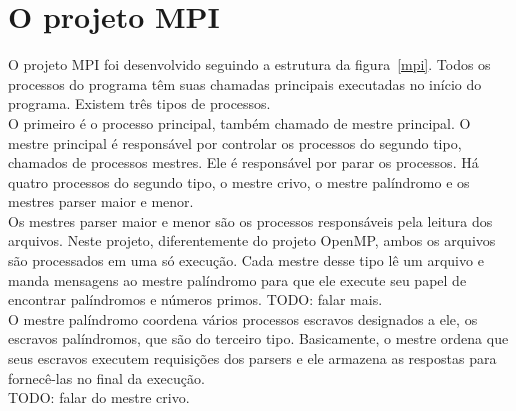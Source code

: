 \documentclass[a4paper]{article}
\begin{document}
\section{O projeto MPI}
\indent \indent O projeto MPI foi desenvolvido seguindo a estrutura da figura~\ref{mpi}. Todos os processos do programa têm suas chamadas principais executadas no início do programa. Existem três tipos de processos.\\
\indent O primeiro é o processo principal, também chamado de mestre principal. O mestre principal é responsável por controlar os processos do segundo tipo, chamados de processos mestres. Ele é responsável por parar os processos. Há quatro processos do segundo tipo, o mestre crivo, o mestre palíndromo e os mestres parser maior e menor.\\
\indent Os mestres parser maior e menor são os processos responsáveis pela leitura dos arquivos. Neste projeto, diferentemente do projeto OpenMP, ambos os arquivos são processados em uma só execução. Cada mestre desse tipo lê um arquivo e manda mensagens ao mestre palíndromo para que ele execute seu papel de encontrar palíndromos e números primos. TODO: falar mais.\\
\indent O mestre palíndromo coordena vários processos escravos designados a ele, os escravos palíndromos, que são do terceiro tipo. Basicamente, o mestre ordena que seus escravos executem requisições dos parsers e ele armazena as respostas para fornecê-las no final da execução.\\
\indent TODO: falar do mestre crivo.\\
\end{document}
